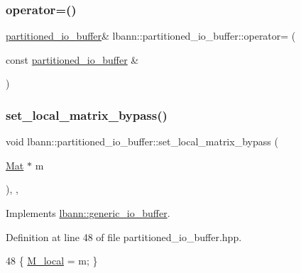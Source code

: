 \subsubsection{\texorpdfstring{operator=()}{operator=()}}
{\footnotesize\ttfamily \hyperlink{classlbann_1_1partitioned__io__buffer}{partitioned\+\_\+io\+\_\+buffer}\& lbann\+::partitioned\+\_\+io\+\_\+buffer\+::operator= (\begin{DoxyParamCaption}\item[{const \hyperlink{classlbann_1_1partitioned__io__buffer}{partitioned\+\_\+io\+\_\+buffer} \&}]{ }\end{DoxyParamCaption})\hspace{0.3cm}{\ttfamily [default]}}

\mbox{\label{classlbann_1_1partitioned__io__buffer_a58412c3f37ea3fbcf492f127781c7617}} 
\subsubsection{\texorpdfstring{set\+\_\+local\+\_\+matrix\+\_\+bypass()}{set\_local\_matrix\_bypass()}}
{\footnotesize\ttfamily void lbann\+::partitioned\+\_\+io\+\_\+buffer\+::set\+\_\+local\+\_\+matrix\+\_\+bypass (\begin{DoxyParamCaption}\item[{\hyperlink{base_8hpp_a68f11fdc31b62516cb310831bbe54d73}{Mat} $\ast$}]{m }\end{DoxyParamCaption})\hspace{0.3cm}{\ttfamily [inline]}, {\ttfamily [override]}, {\ttfamily [virtual]}}



Implements \hyperlink{classlbann_1_1generic__io__buffer_af84c26ab5ee77d1d9ed9ea5d62823815}{lbann\+::generic\+\_\+io\+\_\+buffer}.



Definition at line 48 of file partitioned\+\_\+io\+\_\+buffer.\+hpp.


\begin{DoxyCode}
48 \{ \hyperlink{classlbann_1_1partitioned__io__buffer_a80d8916c269b26e605637353abe322b2}{M\_local} = m; \}
\end{DoxyCode}
\mbox{\label{classlbann_1_1partitioned__io__buffer_aa0a1d61dcecdd5c4091e0a97eb2d075a}} 
